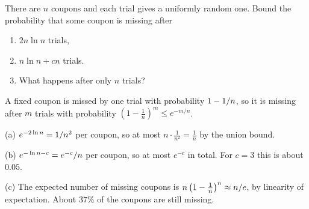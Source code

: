\begin{exercisebox}
\begin{pproblem}\label{pp:coupon}
    There are $n$ coupons and each trial gives a uniformly random one. Bound the probability that
    some coupon is missing after
    \begin{enumerate}[label=(\alph*)]
        \item $2n \ln n$ trials,
        \item $n \ln n + cn$ trials.
        \item What happens after only $n$ trials?
    \end{enumerate}
\end{pproblem}
\tcblower
\begin{wsolution}
    A fixed coupon is missed by one trial with probability $1 - 1/n$, so it is missing
    after $m$ trials with probability $\left(1 - \frac{1}{n}\right)^m \leq e^{-m/n}$.

    (a) $e^{-2 \ln n} = 1/n^2$ per coupon, so at most $n \cdot \frac{1}{n^2} = \frac{1}{n}$
    by the union bound.

    (b) $e^{-\ln n - c} = e^{-c}/n$ per coupon, so at most $e^{-c}$ in total. For $c = 3$
    this is about $0.05$.

    (c) The expected number of missing coupons is
    $n\left(1 - \frac{1}{n}\right)^n \approx n/e$, by linearity of expectation. About
    $37\%$ of the coupons are still missing.
\end{wsolution}
\end{exercisebox}

